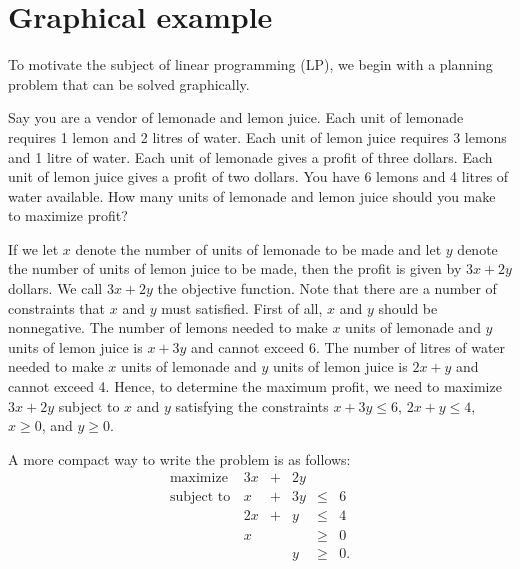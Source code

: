 %

\section{Graphical example}\label{graphic}

To motivate the subject of linear programming (LP), we begin with a
planning problem that can be solved graphically.

Say you are a vendor of lemonade and lemon juice. Each unit of lemonade
requires 1 lemon and 2 litres of water. Each unit of lemon juice
requires 3 lemons and 1 litre of water. Each unit of lemonade gives a
profit of three dollars. Each unit of lemon juice gives a profit of two
dollars. You have 6 lemons and 4 litres of water available. How many
units of lemonade and lemon juice should you make to maximize profit?

If we let \(x\) denote the number of units of lemonade to be made and
let \(y\) denote the number of units of lemon juice to be made, then the
profit is given by \(3x + 2y\) dollars. We call \(3x + 2y\) the
objective function. Note that there are a number of constraints that
\(x\) and \(y\) must satisfied. First of all, \(x\) and \(y\) should be
nonnegative. The number of lemons needed to make \(x\) units of lemonade
and \(y\) units of lemon juice is \(x+3y\) and cannot exceed 6. The
number of litres of water needed to make \(x\) units of lemonade and
\(y\) units of lemon juice is \(2x+y\) and cannot exceed 4. Hence, to
determine the maximum profit, we need to maximize \(3x + 2y\) subject to
\(x\) and \(y\) satisfying the constraints \(x + 3y \leq 6\),
\(2x + y \leq 4\), \(x \geq 0\), and \(y \geq 0.\)

A more compact way to write the problem is as follows:
\[\begin{array}{rrcrll}
\mbox{maximize } & 3x & + & 2y & \\
\mbox{subject to} 
& x & + & 3y & \leq & 6 \\
& 2x & +&  y & \leq & 4 \\
& x &  & & \geq & 0 \\
& & & y & \geq & 0. \\
\end{array}\]

